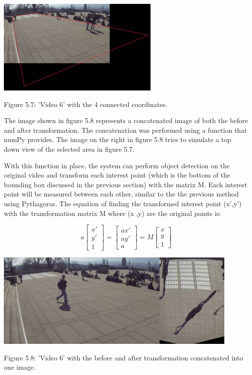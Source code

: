 \documentclass[12pt]{report}
\begin{document}
\begin{center}
	\includegraphics[width=80mm]{./images/appendix/QuadSelected.JPG}
	
	{\footnotesize Figure 5.7: 'Video 6' with the 4 connected coordinates.}
\end{center}

The image shown in figure 5.8 represents a concatenated image of both the before and after transformation. The concatenation was performed using a function that numPy provides. The image on the right in figure 5.8 tries to simulate a top down view of the selected area in figure 5.7. 

\vspace{2mm}

With this function in place, the system can perform object detection on the original video and transform each interest point (which is the bottom of the bounding box discussed in the previous section) with the matrix M. Each interest point will be measured between each other, similar to the the previous method using Pythagoras. The equation of finding the transformed interest point (x',y') with the transformation matrix M where (x ,y) are the original points is:

\begin{equation*}
a
\begin{bmatrix}
x' \\
y' \\
1
\end{bmatrix}
=
\begin{bmatrix}
ax' \\
ay' \\
a
\end{bmatrix}
= M
\begin{bmatrix}
x \\
y \\
1
\end{bmatrix}
\end{equation*}

\begin{center}
	\includegraphics[width=120mm]{./images/appendix/ConcatenateImages.JPG}
	
	{\footnotesize Figure 5.8: 'Video 6' with the before and after transformation concatenated into one image.}
\end{center}
\end{document}
